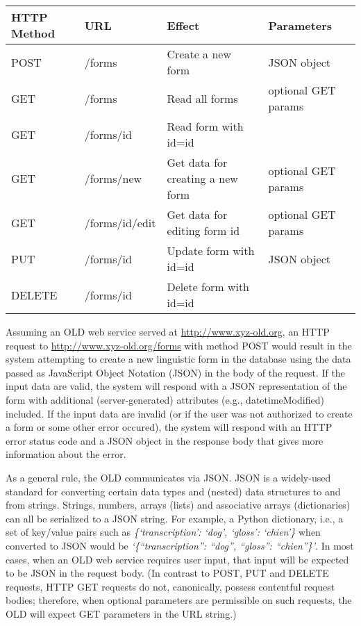 \documentclass[letterpaper,10pt,english]{sphinxmanual}
\begin{document}
\begin{tabulary}{\linewidth}{|L|L|L|L|}
\hline
\textbf{
HTTP Method
} & \textbf{
URL
} & \textbf{
Effect
} & \textbf{
Parameters
}\\\hline

POST
 & 
/forms
 & 
Create a new form
 & 
JSON object
\\\hline

GET
 & 
/forms
 & 
Read all forms
 & 
optional GET params
\\\hline

GET
 & 
/forms/id
 & 
Read form with id=id
 & \\\hline

GET
 & 
/forms/new
 & 
Get data for creating a new form
 & 
optional GET params
\\\hline

GET
 & 
/forms/id/edit
 & 
Get data for editing form id
 & 
optional GET params
\\\hline

PUT
 & 
/forms/id
 & 
Update form with id=id
 & 
JSON object
\\\hline

DELETE
 & 
/forms/id
 & 
Delete form with id=id
 & \\\hline
\end{tabulary}


Assuming an OLD web service served at \href{http://www.xyz-old.org}{http://www.xyz-old.org}, an HTTP request to
\href{http://www.xyz-old.org/forms}{http://www.xyz-old.org/forms} with method POST would result in the system
attempting to create a new linguistic form in the database using the data passed
as JavaScript Object Notation (JSON) in the body of the request.  If the input
data are valid, the system will respond with a JSON representation of the form
with additional (server-generated) attributes (e.g., datetimeModified) included.
If the input data are invalid (or if the user was not authorized to create a
form or some other error occured), the system will respond with an HTTP error
status code and a JSON object in the response body that gives more information
about the error.

As a general rule, the OLD communicates via JSON.  JSON is a widely-used
standard for converting certain data types and (nested) data structures to and from
strings.  Strings, numbers, arrays (lists) and associative arrays (dictionaries)
can all be serialized to a JSON string.  For example, a Python dictionary, i.e.,
a set of key/value pairs such as \emph{\{`transcription': `dog', `gloss': `chien'\}}
when converted to JSON would be \emph{`\{``transcription'': ``dog'', ``gloss'': ``chien''\}'}.
In most cases, when an OLD web service requires user input, that input will be
expected to be JSON in the request body.  (In contrast to POST, PUT and DELETE
requests, HTTP GET requests do not, canonically, possess contentful request
bodies; therefore, when optional parameters are permissible on such requests,
the OLD will expect GET parameters in the URL string.)
\end{document}
